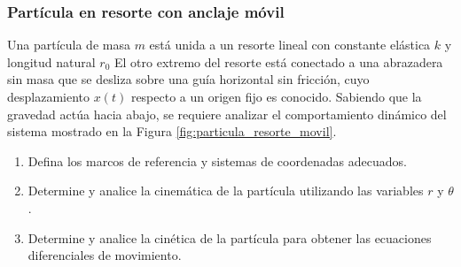 \subsubsection{Partícula en resorte con anclaje móvil}

Una partícula de masa $m$ está unida a un resorte lineal con constante elástica $k$ y longitud natural $r_0$ El otro extremo del resorte está conectado a una abrazadera sin masa que se desliza sobre una guía horizontal sin fricción, cuyo desplazamiento $x(t)$ respecto a un origen fijo es conocido. Sabiendo que la gravedad actúa hacia abajo, se requiere analizar el comportamiento dinámico del sistema mostrado en la Figura \ref{fig:particula_resorte_movil}.

\begin{enumerate}
    \item Defina los marcos de referencia y sistemas de coordenadas adecuados.
    \item Determine y analice la cinemática de la partícula utilizando las variables $r$ y $\theta$.
    \item Determine y analice la cinética de la partícula para obtener las ecuaciones diferenciales de movimiento.
\end{enumerate}

